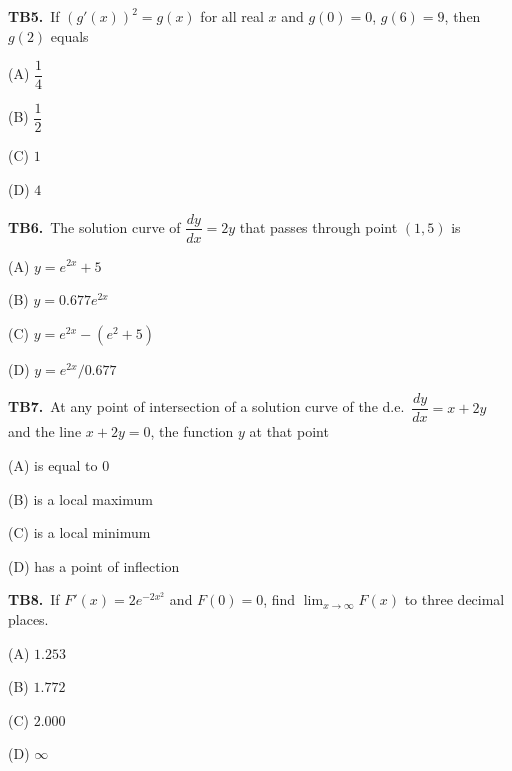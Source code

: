 \documentclass[11pt]{article}
\begin{document}
\bigskip\noindent\textbf{TB5.}\ If $(g'(x))^2=g(x)$ for all real $x$ and $g(0)=0$, $g(6)=9$, then $g(2)$ equals
\begin{list}{}{\setlength{\leftmargin}{3em}\setlength{\labelwidth}{2.5em}\setlength{\itemsep}{0pt}\setlength{\topsep}{2pt}}
\item[(A)] $\dfrac{1}{4}$
\item[(B)] $\dfrac{1}{2}$
\item[(C)] $1$
\item[(D)] $4$
\end{list}

\bigskip\noindent\textbf{TB6.}\ The solution curve of $\dfrac{dy}{dx}=2y$ that passes through point $(1,5)$ is
\begin{list}{}{\setlength{\leftmargin}{3em}\setlength{\labelwidth}{2.5em}\setlength{\itemsep}{0pt}\setlength{\topsep}{2pt}}
\item[(A)] $y=e^{2x}+5$
\item[(B)] $y=0.677e^{2x}$
\item[(C)] $y=e^{2x}-(e^2+5)$
\item[(D)] $y=e^{2x}/0.677$
\end{list}

\bigskip\noindent\textbf{TB7.}\ At any point of intersection of a solution curve of the d.e.\ $\dfrac{dy}{dx}=x+2y$ and the line $x+2y=0$, the function $y$ at that point
\begin{list}{}{\setlength{\leftmargin}{3em}\setlength{\labelwidth}{2.5em}\setlength{\itemsep}{0pt}\setlength{\topsep}{2pt}}
\item[(A)] is equal to $0$
\item[(B)] is a local maximum
\item[(C)] is a local minimum
\item[(D)] has a point of inflection
\end{list}

\bigskip\noindent\textbf{TB8.}\ If $F\prime(x)=2e^{-2x^2}$ and $F(0)=0$, find $\lim_{x\to\infty}F(x)$ to three decimal places.
\begin{list}{}{\setlength{\leftmargin}{3em}\setlength{\labelwidth}{2.5em}\setlength{\itemsep}{0pt}\setlength{\topsep}{2pt}}
\item[(A)] $1.253$
\item[(B)] $1.772$
\item[(C)] $2.000$
\item[(D)] $\infty$
\end{list}
\end{document}
